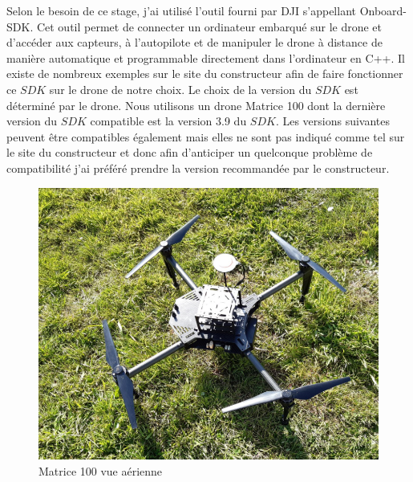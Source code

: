 				Selon le besoin de ce stage, j'ai utilisé l'outil fourni par DJI s'appellant Onboard-SDK\cite{githubSDK}. Cet outil permet de connecter un ordinateur embarqué sur le drone et d'accéder aux capteurs, à l'autopilote et de manipuler le drone à distance de manière automatique et programmable directement dans l'ordinateur en C++. Il existe de nombreux exemples sur le site du constructeur afin de faire fonctionner ce $SDK$ sur le drone de notre choix. Le choix de la version du $SDK$ est déterminé par le drone. Nous utilisons un drone Matrice 100 dont la dernière version du $SDK$ compatible est la version 3.9 du $SDK$. Les versions suivantes peuvent être compatibles également mais elles ne sont pas indiqué comme tel sur le site du constructeur et donc afin d'anticiper un quelconque problème de compatibilité j'ai préféré prendre la version recommandée par le constructeur.
				
				\begin{figure}[H]
        		    \centering
        		    \includegraphics[width=1\textwidth]{image/drone.png}
        		    \caption{Matrice 100 vue aérienne}
        		    \label{fig:drone}
		        \end{figure}